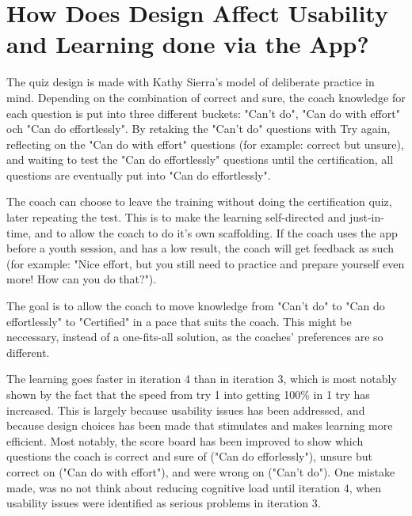 
\section{How Does Design Affect Usability and Learning done via the App?}

  The quiz design is made with Kathy Sierra's model of deliberate practice in mind. \cite{sierra} Depending on the combination of correct and sure, the coach knowledge for each question is put into three different buckets: "Can't do", "Can do with effort" och "Can do effortlessly". By retaking the "Can't do" questions with Try again, reflecting on the "Can do with effort" questions (for example: correct but unsure), and waiting to test the "Can do effortlessly" questions until the certification, all questions are eventually put into "Can do effortlessly".

  The coach can choose to leave the training without doing the certification quiz, later repeating the test. This is to make the learning self-directed and just-in-time, and to allow the coach to do it's own scaffolding. If the coach uses the app before a youth session, and has a low result, the coach will get feedback as such (for example: "Nice effort, but you still need to practice and prepare yourself even more! How can you do that?").

  The goal is to allow the coach to move knowledge from "Can't do" to "Can do effortlessly" to "Certified" in a pace that suits the coach. This might be neccessary, instead of a one-fits-all solution, as the coaches' preferences are so different.

  The learning goes faster in iteration 4 than in iteration 3, which is most notably shown by the fact that the speed from try 1 into getting 100\% in 1 try has increased. This is largely because usability issues has been addressed, and because design choices has been made that stimulates and makes learning more efficient. Most notably, the score board has been improved to show which questions the coach is correct and sure of ("Can do efforlessly"), unsure but correct on ("Can do with effort"), and were wrong on ("Can't do"). One mistake made, was no not think about reducing cognitive load \cite{sierra} until iteration 4, when usability issues were identified as serious problems in iteration 3.

